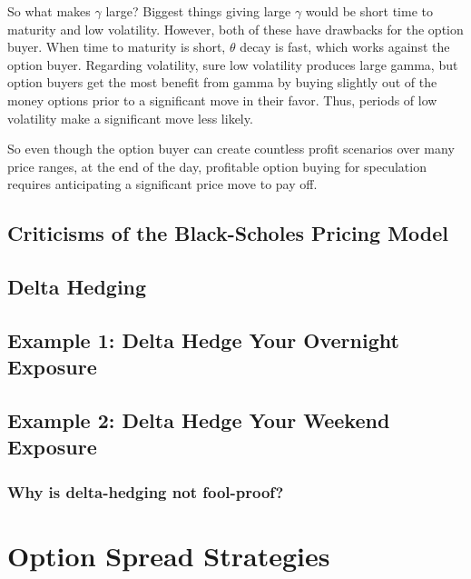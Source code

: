 \documentclass[
]{book}
\begin{document}
So what makes \(\gamma\) large? Biggest things giving large \(\gamma\) would be short time to maturity and low volatility. However, both of these have drawbacks for the option buyer. When time to maturity is short, \(\theta\) decay is fast, which works against the option buyer. Regarding volatility, sure low volatility produces large gamma, but option buyers get the most benefit from gamma by buying slightly out of the money options prior to a significant move in their favor. Thus, periods of low volatility make a significant move less likely.

So even though the option buyer can create countless profit scenarios over many price ranges, at the end of the day, profitable option buying for speculation requires anticipating a significant price move to pay off.

\hypertarget{criticisms-of-the-black-scholes-pricing-model}{%
\section{Criticisms of the Black-Scholes Pricing Model}\label{criticisms-of-the-black-scholes-pricing-model}}

\hypertarget{delta-hedging}{%
\section{Delta Hedging}\label{delta-hedging}}

\hypertarget{example-1-delta-hedge-your-overnight-exposure}{%
\section{Example 1: Delta Hedge Your Overnight Exposure}\label{example-1-delta-hedge-your-overnight-exposure}}

\hypertarget{example-2-delta-hedge-your-weekend-exposure}{%
\section{Example 2: Delta Hedge Your Weekend Exposure}\label{example-2-delta-hedge-your-weekend-exposure}}

\hypertarget{why-is-delta-hedging-not-fool-proof}{%
\subsection{Why is delta-hedging not fool-proof?}\label{why-is-delta-hedging-not-fool-proof}}

\hypertarget{option-spread-strategies}{%
\chapter{Option Spread Strategies}\label{option-spread-strategies}}
\end{document}
